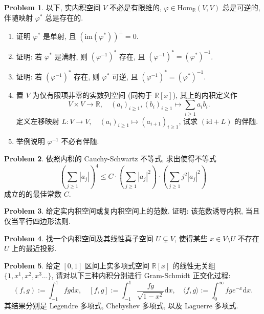 \documentclass{MainStyle}
\theoremstyle{definition}
\newtheorem{problem}{Problem}
\begin{document}
\begin{problem}
以下, 实内积空间 $V$ 不必是有限维的, $\varphi \in \mathrm{Hom}_{\mathbb R}(V,V)$ 总是可逆的, 伴随映射 $\varphi^\ast$ 总是存在的.
\begin{enumerate}
    \item 证明 $\varphi ^\ast$ 是单射, 且 $(\mathrm{im}(\varphi^\ast ))^\perp=0$.
    \item 证明: 若 $\varphi^\ast$ 是满射, 则 $(\varphi^{-1})^{\ast}$ 存在, 且 $(\varphi^{-1})^\ast=(\varphi^\ast)^{-1}$.
    \item 证明: 若 $(\varphi^{-1})^\ast$ 存在, 则 $\varphi^\ast$ 可逆, 且 $(\varphi^{-1})^\ast=(\varphi^\ast)^{-1}$.
    \item 置 $V$ 为仅有限项非零的实数列空间 (同构于 $\mathbb R[x]$), 其上的内积定义作
          \begin{equation}
              V\times V\to \mathbb R,\quad (a_i)_{i\geq 1},(b_i)_{i\geq 1}\mapsto \sum_{i\geq 1}a_ib_i.
          \end{equation}
          定义左移映射 $L:V\to V,\quad (a_i)_{i\geq 1}\mapsto (a_{i+1})_{i\geq 1}$, 试求 $(\mathrm{id}+L)$ 的伴随.
    \item 举例说明 $\varphi^{-1}$ 不必有伴随.
\end{enumerate}
\end{problem}

\begin{problem}
依照内积的 Cauchy-Schwartz 不等式, 求出使得不等式
\begin{equation}
    \left(\sum_{j\geq 1} |a_j|\right)^4\leq C\cdot \left(\sum_{j\geq 1} |a_j|^2\right)\cdot \left(\sum_{j\geq 1} j^2|a_j|^2\right)
\end{equation}
成立的的最佳常数 $C$.
\end{problem}

\begin{problem}
给定实内积空间或复内积空间上的范数. 证明: 该范数诱导内积, 当且仅当平行四边形法则.
\end{problem}

\begin{problem}
找一个内积空间及其线性真子空间 $U\subsetneq V$, 使得某些 $x\in V\setminus U$ 不存在 $U$ 上的最近投影.
\end{problem}

\begin{problem}
给定 $[0,1]$ 区间上实多项式空间 $\mathbb R[x]$ 的线性无关组 $\{1,x^1,x^2,x^3\ldots\}$, 请对以下三种内积分别进行 Gram-Schmidt 正交化过程:
\begin{equation}
    (f,g):=\int_{-1}^1 fg\mathrm{d}x,\quad [f,g]:=\int_{-1}^1\frac{fg}{\sqrt{1-x^2}}\mathrm{d}x,\quad \langle f,g\rangle:=\int_0^\infty fg e^{-x}\mathrm{d}x.
\end{equation}
其结果分别是 Legendre 多项式, Chebyshev 多项式, 以及 Laguerre 多项式.
\end{problem}
\end{document}
